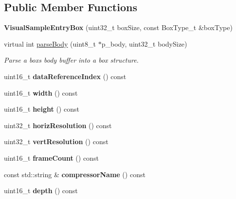 \subsection*{Public Member Functions}
\begin{DoxyCompactItemize}
\item 
\mbox{\label{classmp4_parser_1_1_visual_sample_entry_box_a87a3ac4dfc6314185e203348e782f72d}} 
{\bfseries Visual\+Sample\+Entry\+Box} (uint32\+\_\+t box\+Size, const Box\+Type\+\_\+t \&box\+Type)
\item 
virtual int \mbox{\hyperlink{classmp4_parser_1_1_visual_sample_entry_box_a336c8d02232f769e50dcbd4c031bf274}{parse\+Body}} (uint8\+\_\+t $\ast$p\+\_\+body, uint32\+\_\+t body\+Size)
\begin{DoxyCompactList}\small\item\em Parse a box\textquotesingle{}s body buffer into a box structure. \end{DoxyCompactList}\item 
\mbox{\label{classmp4_parser_1_1_visual_sample_entry_box_a4d2d96e1ba65092f6f11b32adc89c3e6}} 
uint16\+\_\+t {\bfseries data\+Reference\+Index} () const
\item 
\mbox{\label{classmp4_parser_1_1_visual_sample_entry_box_ae1198e4baf6ac56175c1c8e07436a473}} 
uint16\+\_\+t {\bfseries width} () const
\item 
\mbox{\label{classmp4_parser_1_1_visual_sample_entry_box_a3734fdea7856c1ba310b8e6cc4f58524}} 
uint16\+\_\+t {\bfseries height} () const
\item 
\mbox{\label{classmp4_parser_1_1_visual_sample_entry_box_a7b9b869675bc463a09b735f9b00ef944}} 
uint32\+\_\+t {\bfseries horiz\+Resolution} () const
\item 
\mbox{\label{classmp4_parser_1_1_visual_sample_entry_box_a47630df8b27852669afe02e5f6391f69}} 
uint32\+\_\+t {\bfseries vert\+Resolution} () const
\item 
\mbox{\label{classmp4_parser_1_1_visual_sample_entry_box_ab119fc809b46e744f9d21d0c00242453}} 
uint16\+\_\+t {\bfseries frame\+Count} () const
\item 
\mbox{\label{classmp4_parser_1_1_visual_sample_entry_box_a9a3a79fcf2bf978502189798bb697425}} 
const std\+::string \& {\bfseries compressor\+Name} () const
\item 
\mbox{\label{classmp4_parser_1_1_visual_sample_entry_box_a37f087f400a5288a3af94b7e145854a9}} 
uint16\+\_\+t {\bfseries depth} () const
\end{DoxyCompactItemize}

